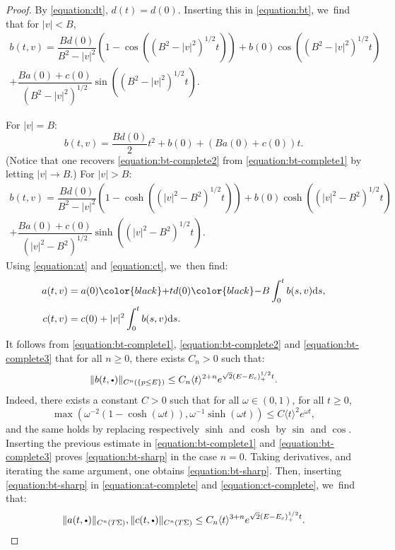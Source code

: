 \documentclass[JEP,XML,SOM,Unicode,published]{cedram}
\newcommand{\sbullet}{{\scriptscriptstyle\bullet}}
\newcommand{\csbullet}{{\raisebox{1pt}{$\sbullet$}}}
\theoremstyle{plain}
\theoremstyle{definition}
\newcommand{\dd}{\mathrm{d}}
\begin{document}
\begin{proof}
\noindent
\begin{minipage}{\textwidth}
By \eqref{equation:dt}, $d(t)=d(0)$. Inserting this in \eqref{equation:bt}, we~find that for $|v| < B$,
\begin{multline}
\label{equation:bt-complete1}
b(t,v) = \dfrac{Bd(0)}{B^2-|v|^2}\left(1-\cos((B^2-|v|^2)^{1/2}t) \right) + b(0) \cos((B^2-|v|^2)^{1/2}t) \\
+ \dfrac{Ba(0)+c(0)}{(B^2-|v|^2)^{1/2}} \sin((B^2-|v|^2)^{1/2}t).
\end{multline}
\end{minipage}
\par\noindent
For $|v|=B$:
\begin{equation}
\label{equation:bt-complete2}
b(t,v) = \dfrac{Bd(0)}{2} t^2 + b(0) + (Ba(0)+c(0))t.
\end{equation}
(Notice that one recovers \eqref{equation:bt-complete2} from \eqref{equation:bt-complete1} by letting $|v| \to B$.) For $|v| > B$:
\begin{multline}
\label{equation:bt-complete3}
b(t,v) = \dfrac{Bd(0)}{B^2-|v|^2}\left(1-\cosh((|v|^2-B^2)^{1/2}t) \right) + b(0) \cosh((|v|^2-B^2)^{1/2}t) \\
+ \dfrac{Ba(0)+c(0)}{(|v|^2-B^2)^{1/2}} \sinh((|v|^2-B^2)^{1/2}t).
\end{multline}
Using \eqref{equation:at} and \eqref{equation:ct}, we~then find:
\begin{align}
\label{equation:at-complete}
a(t,v) &= a(0) {\color{black}+} td(0) {\color{black}-} B\int_0^t b(s,v) \dd s, \\
\label{equation:ct-complete}
c(t,v) &= c(0) + |v|^2 \int_0^t b(s,v) \dd s.
\end{align}
It follows from \eqref{equation:bt-complete1}, \eqref{equation:bt-complete2} and \eqref{equation:bt-complete3} that for all $n \geq 0$, there exists $C_n > 0$ such that:
\begin{equation}
\label{equation:bt-sharp}
\|b(t,\csbullet)\|_{C^n(\{p \leq E\})} \leq C_n \langle t \rangle^{2+n} e^{\sqrt{2}(E-E_c)_+^{1/2}t}.
\end{equation}
Indeed, there exists a constant $C > 0$ such that for all $\omega \in (0,1)$, for all $t \geq 0$,
\[
\max\left(\omega^{-2}(1-\cosh(\omega t)), \omega^{-1}\sinh(\omega t)\right) \leq C \langle t\rangle^2 e^{\omega t},
\]
and the same holds by replacing respectively $\sinh$ and $\cosh$ by $\sin$ and $\cos$. Inserting the previous estimate in \eqref{equation:bt-complete1} and \eqref{equation:bt-complete3} proves \eqref{equation:bt-sharp} in the case $n=0$. Taking derivatives, and iterating the same argument, one obtains \eqref{equation:bt-sharp}. Then, inserting \eqref{equation:bt-sharp} in \eqref{equation:at-complete} and \eqref{equation:ct-complete}, we~find that:
\begin{equation}
\label{equation:at-ct-sharp}
\|a(t,\csbullet)\|_{C^n(T\Sigma)}, \|c(t,\csbullet)\|_{C^n(T\Sigma)} \leq C_n \langle t\rangle^{3+n} e^{\sqrt{2}(E-E_c)_+^{1/2}t}.
\end{equation}


\end{proof}
\end{document}
